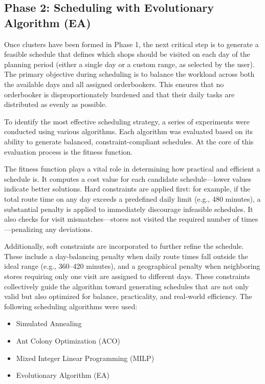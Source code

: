 \subsection{Phase 2: Scheduling with Evolutionary Algorithm (EA)} %
Once clusters have been formed in Phase 1, the next critical step is to generate a feasible schedule that defines which shops should be visited on each day of the planning period (either a single day or a custom range, as selected by the user). The primary objective during scheduling is to balance the workload across both the available days and all assigned orderbookers. This ensures that no orderbooker is disproportionately burdened and that their daily tasks are distributed as evenly as possible.

To identify the most effective scheduling strategy, a series of experiments were conducted using various algorithms. Each algorithm was evaluated based on its ability to generate balanced, constraint-compliant schedules. At the core of this evaluation process is the fitness function.

The fitness function plays a vital role in determining how practical and efficient a schedule is. It computes a cost value for each candidate schedule—lower values indicate better solutions. Hard constraints are applied first: for example, if the total route time on any day exceeds a predefined daily limit (e.g., 480 minutes), a substantial penalty is applied to immediately discourage infeasible schedules. It also checks for visit mismatches—stores not visited the required number of times—penalizing any deviations.

Additionally, soft constraints are incorporated to further refine the schedule. These include a day-balancing penalty when daily route times fall outside the ideal range (e.g., 360–420 minutes), and a geographical penalty when neighboring stores requiring only one visit are assigned to different days. These constraints collectively guide the algorithm toward generating schedules that are not only valid but also optimized for balance, practicality, and real-world efficiency. The following scheduling algorithms were used:

\begin{itemize}
    \item Simulated Annealing
    \item Ant Colony Optimization (ACO)
    \item Mixed Integer Linear Programming (MILP)
    \item Evolutionary Algorithm (EA)
\end{itemize}

